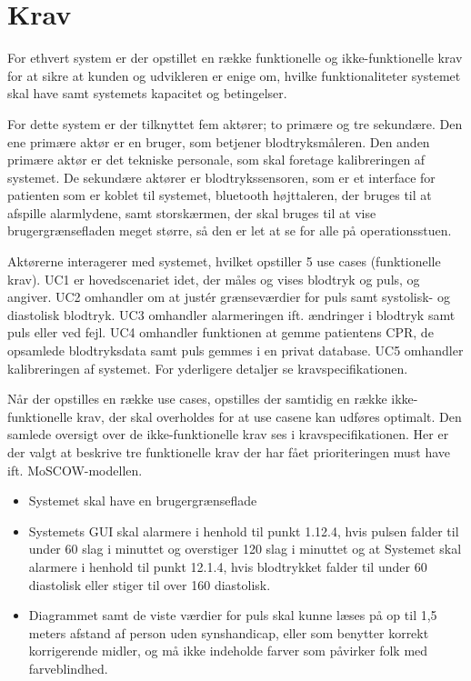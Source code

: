 \section{Krav}
For ethvert system er der opstillet en række funktionelle og ikke-funktionelle krav for at sikre at kunden og udvikleren er enige om, hvilke funktionaliteter systemet skal have samt systemets kapacitet og betingelser.

For dette system er der tilknyttet fem aktører; to primære og tre sekundære. Den ene primære aktør er en bruger, som betjener blodtryksmåleren. Den anden primære aktør er det tekniske personale, som skal foretage kalibreringen af systemet. De sekundære aktører er blodtrykssensoren, som er et interface for patienten som er koblet til systemet, bluetooth højttaleren, der bruges til at afspille alarmlydene, samt storskærmen, der skal bruges til at vise brugergrænsefladen meget større, så den er let at se for alle på operationsstuen.

Aktørerne interagerer med systemet, hvilket opstiller 5 use cases (funktionelle krav). UC1 er hovedscenariet idet, der måles og vises blodtryk og puls, og angiver.  UC2 omhandler om at justér grænseværdier for puls samt systolisk- og diastolisk blodtryk. UC3 omhandler alarmeringen ift. ændringer i blodtryk samt puls eller ved fejl. UC4 omhandler funktionen at gemme patientens CPR, de opsamlede blodtryksdata samt puls gemmes i en privat database. UC5 omhandler kalibreringen af systemet. For yderligere detaljer se kravspecifikationen.

Når der opstilles en række use cases, opstilles der samtidig en række ikke-funktionelle krav, der skal overholdes for at use casene kan udføres optimalt. Den samlede oversigt over de ikke-funktionelle krav ses i kravspecifikationen. Her er der valgt at beskrive tre funktionelle krav der har fået prioriteringen must have ift. MoSCOW-modellen.

\begin{itemize}
\item Systemet skal have en brugergrænseflade \\
\item Systemets GUI skal alarmere i henhold til punkt 1.12.4, hvis pulsen
falder til under 60 slag i minuttet og overstiger 120 slag i minuttet  og at Systemet skal
alarmere i henhold til punkt 12.1.4, hvis blodtrykket falder til under 60
diastolisk eller stiger til over 160 diastolisk. \\
\item Diagrammet samt de viste værdier for puls skal kunne læses på op til 1,5 meters afstand af person uden synshandicap, eller som benytter korrekt korrigerende midler, og må ikke indeholde farver som påvirker folk med farveblindhed. 
\end{itemize}

